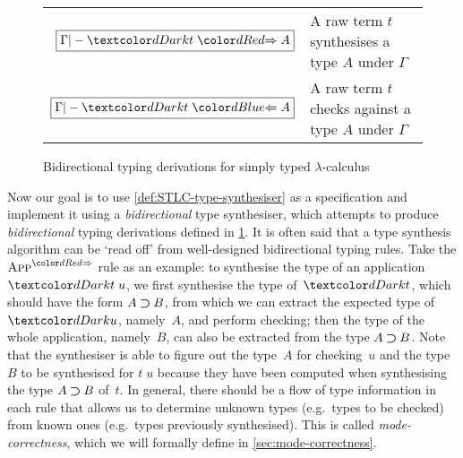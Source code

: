 \begin{figure}
  \small
  \bgroup
  \renewcommand{\arraystretch}{1.5}
  \begin{tabular}{ r l }
    $\boxed{\Gamma |- \isTerm{t} \syn A}$ & A raw term $t$ synthesises a type $A$ under $\Gamma$ \\
    $\boxed{\Gamma |- \isTerm{t} \chk A}$ &A raw term $t$ checks against a type $A$ under $\Gamma$
  \end{tabular}
  \egroup
  \centering
  \caption{Bidirectional typing derivations for simply typed $\lambda$-calculus}
  \label{fig:STLC-bidirectional-typing-derivations}
\end{figure}

Now our goal is to use \cref{def:STLC-type-synthesiser} as a specification and implement it using a \emph{bidirectional} type synthesiser, which attempts to produce \emph{bidirectional} typing derivations defined in \cref{fig:STLC-bidirectional-typing-derivations}.
It is often said that a type synthesis algorithm can be `read off' from well-designed bidirectional typing rules.
Take the $\SynRule{App}$ rule as an example:
to synthesise the type of an application $\isTerm{t\;u}$, we first synthesise the type of~$\isTerm{t}$, which should have the form $A \mathbin{\bm{\supset}} B$, from which we can extract the expected type of~$\isTerm{u}$, namely~$A$, and perform checking; then the type of the whole application, namely~$B$, can also be extracted from the type $A \mathbin{\bm{\supset}} B$.
Note that the synthesiser is able to figure out the type~$A$ for checking~$u$ and the type~$B$ to be synthesised for $t\;u$ because they have been computed when synthesising the type $A \mathbin{\bm{\supset}} B$ of~$t$.
In general, there should be a flow of type information in each rule that allows us to determine unknown types (e.g.~types to be checked) from known ones (e.g.~types previously synthesised).
This is called \emph{mode-correctness}, which we will formally define in \cref{sec:mode-correctness}.

